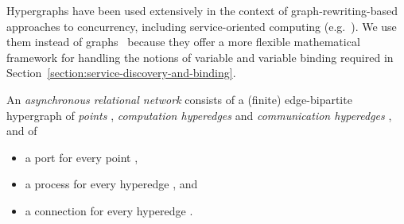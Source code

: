 \documentclass{LMCS}
\begin{document}
  Hypergraphs have been used extensively in the context of graph-rewriting-based approaches to concurrency, including service-oriented computing (e.g.~\cite{Bruni-Gadducci-LluchLafuente:A-graph-syntax-for-processes-and-services-2009,Ferrari-Hirsch-Lanese-Montanari-Tuosto:Synchronised-hyperedge-replacement-2005}).  We use them instead of graphs~\cite{Fiadeiro-Lopes:An-interface-theory-for-service-oriented-design-2013} because they offer a more flexible mathematical framework for handling the notions of variable and variable binding required in Section~\ref{section:service-discovery-and-binding}.

  \begin{defi}
    \label{definition:ARN}
    An \emph{asynchronous relational network}  consists of a (finite) edge-bipartite hypergraph  of \emph{points} , \emph{computation hyperedges}  and \emph{communication hyperedges} , and of
    \begin{itemize}
      
    \item a port  for every point ,
      
    \item a process  for every hyperedge , and
      
    \item a connection  for every hyperedge .
      
    \end{itemize}
  \end{defi}
\end{document}
